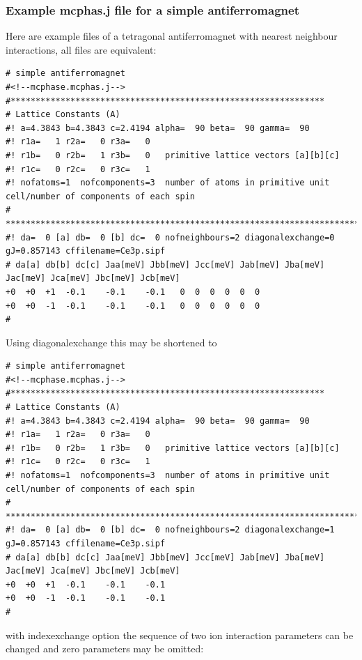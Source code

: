 \subsubsection{Example {\prg mcphas.j} file for a simple antiferromagnet}

Here are example files of a tetragonal antiferromagnet with nearest neighbour interactions, all
files are equivalent:

{\small
\begin{verbatim} 
# simple antiferromagnet 
#<!--mcphase.mcphas.j-->
#***************************************************************
# Lattice Constants (A)
#! a=4.3843 b=4.3843 c=2.4194 alpha=  90 beta=  90 gamma=  90
#! r1a=   1 r2a=   0 r3a=   0
#! r1b=   0 r2b=   1 r3b=   0   primitive lattice vectors [a][b][c]
#! r1c=   0 r2c=   0 r3c=   1
#! nofatoms=1  nofcomponents=3  number of atoms in primitive unit cell/number of components of each spin
# ****************************************************************************
#! da=  0 [a] db=  0 [b] dc=  0 nofneighbours=2 diagonalexchange=0 gJ=0.857143 cffilename=Ce3p.sipf
# da[a] db[b] dc[c] Jaa[meV] Jbb[meV] Jcc[meV] Jab[meV] Jba[meV] Jac[meV] Jca[meV] Jbc[meV] Jcb[meV]
+0	+0	+1	-0.1	-0.1	-0.1   0  0  0  0  0  0
+0	+0	-1	-0.1	-0.1	-0.1   0  0  0  0  0  0
#\end{verbatim}
}

Using diagonalexchange this may be shortened to

{\small
\begin{verbatim} 
# simple antiferromagnet 
#<!--mcphase.mcphas.j-->
#***************************************************************
# Lattice Constants (A)
#! a=4.3843 b=4.3843 c=2.4194 alpha=  90 beta=  90 gamma=  90
#! r1a=   1 r2a=   0 r3a=   0
#! r1b=   0 r2b=   1 r3b=   0   primitive lattice vectors [a][b][c]
#! r1c=   0 r2c=   0 r3c=   1
#! nofatoms=1  nofcomponents=3  number of atoms in primitive unit cell/number of components of each spin
# ****************************************************************************
#! da=  0 [a] db=  0 [b] dc=  0 nofneighbours=2 diagonalexchange=1 gJ=0.857143 cffilename=Ce3p.sipf
# da[a] db[b] dc[c] Jaa[meV] Jbb[meV] Jcc[meV] Jab[meV] Jba[meV] Jac[meV] Jca[meV] Jbc[meV] Jcb[meV]
+0	+0	+1	-0.1	-0.1	-0.1   
+0	+0	-1	-0.1	-0.1	-0.1   
#\end{verbatim}
}

with indexexchange option the sequence of two ion interaction parameters can be changed and
zero parameters may be omitted:

